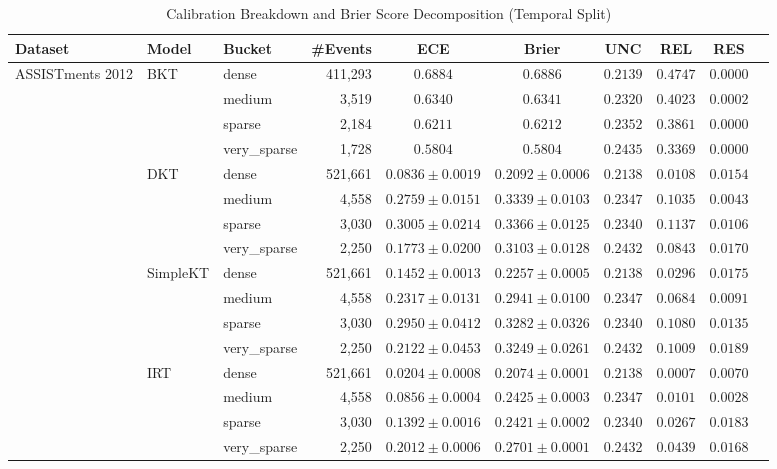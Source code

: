 \begin{table}[h]
\caption{Calibration Breakdown and Brier Score Decomposition (Temporal Split)}
\label{tab:calib_temporal}
\centering
\small
\begin{tabular}{lllrcccccc}
\toprule
Dataset & Model & Bucket & \#Events & ECE & Brier & UNC & REL & RES \\
\midrule
ASSISTments 2012 & BKT & dense & 411,293 & $0.6884$ & $0.6886$ & $0.2139$ & $0.4747$ & $0.0000$ \\
 &  & medium & 3,519 & $0.6340$ & $0.6341$ & $0.2320$ & $0.4023$ & $0.0002$ \\
 &  & sparse & 2,184 & $0.6211$ & $0.6212$ & $0.2352$ & $0.3861$ & $0.0000$ \\
 &  & very\_sparse & 1,728 & $0.5804$ & $0.5804$ & $0.2435$ & $0.3369$ & $0.0000$ \\
 & DKT & dense & 521,661 & $0.0836 \pm 0.0019$ & $0.2092 \pm 0.0006$ & $0.2138$ & $0.0108$ & $0.0154$ \\
 &  & medium & 4,558 & $0.2759 \pm 0.0151$ & $0.3339 \pm 0.0103$ & $0.2347$ & $0.1035$ & $0.0043$ \\
 &  & sparse & 3,030 & $0.3005 \pm 0.0214$ & $0.3366 \pm 0.0125$ & $0.2340$ & $0.1137$ & $0.0106$ \\
 &  & very\_sparse & 2,250 & $0.1773 \pm 0.0200$ & $0.3103 \pm 0.0128$ & $0.2432$ & $0.0843$ & $0.0170$ \\
 & SimpleKT & dense & 521,661 & $0.1452 \pm 0.0013$ & $0.2257 \pm 0.0005$ & $0.2138$ & $0.0296$ & $0.0175$ \\
 &  & medium & 4,558 & $0.2317 \pm 0.0131$ & $0.2941 \pm 0.0100$ & $0.2347$ & $0.0684$ & $0.0091$ \\
 &  & sparse & 3,030 & $0.2950 \pm 0.0412$ & $0.3282 \pm 0.0326$ & $0.2340$ & $0.1080$ & $0.0135$ \\
 &  & very\_sparse & 2,250 & $0.2122 \pm 0.0453$ & $0.3249 \pm 0.0261$ & $0.2432$ & $0.1009$ & $0.0189$ \\
 & IRT & dense & 521,661 & $0.0204 \pm 0.0008$ & $0.2074 \pm 0.0001$ & $0.2138$ & $0.0007$ & $0.0070$ \\
 &  & medium & 4,558 & $0.0856 \pm 0.0004$ & $0.2425 \pm 0.0003$ & $0.2347$ & $0.0101$ & $0.0028$ \\
 &  & sparse & 3,030 & $0.1392 \pm 0.0016$ & $0.2421 \pm 0.0002$ & $0.2340$ & $0.0267$ & $0.0183$ \\
 &  & very\_sparse & 2,250 & $0.2012 \pm 0.0006$ & $0.2701 \pm 0.0001$ & $0.2432$ & $0.0439$ & $0.0168$ \\

\end{tabular}
\end{table}
